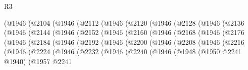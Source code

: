 \begin{lexlean}{R3}
\begin{coremodule}
            (@1946
              (@2104
                (@1946
                  (@2112
                    (@1946
                      (@2120
                        (@1946
                          (@2128
                            (@1946
                              (@2136
                                (@1946
                                  (@2144
                                    (@1946
                                      (@2152
                                        (@1946
                                          (@2160
                                            (@1946
                                              (@2168
                                                (@1946
                                                  (@2176
                                                    (@1946
                                                      (@2184
                                                        (@1946
                                                          (@2192
                                                            (@1946
                                                              (@2200
                                                                (@1946
                                                                  (@2208
                                                                    (@1946
                                                                      (@2216
                                                                        (@1946
                                                                          (@2224
                                                                            (@1946
                                                                              (@2232
                                                                                (@1946
                                                                                  (@2240
                                                                                    (@1946
                                                                                      (@1948
                                                                                        (@1950
                                                                                          @2241
                                                                                          @1940)
                                                                                        (@1957
                                                                                          @2241

\end{coremodule}
\end{lexlean}
